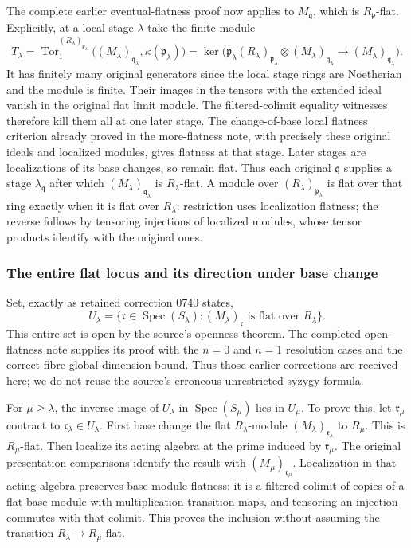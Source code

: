 The complete earlier eventual-flatness proof now applies to \(M_{\mathfrak q}\), which is \(R_{\mathfrak p}\)-flat. Explicitly, at a local stage \(\lambda\) take the finite module \[
 T_\lambda=\operatorname{Tor}^{(R_\lambda)_{\mathfrak p_\lambda}}_1
 \big((M_\lambda)_{\mathfrak q_\lambda},\kappa(\mathfrak p_\lambda)\big)
 =\ker\big(\mathfrak p_\lambda(R_\lambda)_{\mathfrak p_\lambda}
       \otimes (M_\lambda)_{\mathfrak q_\lambda}
       \longrightarrow(M_\lambda)_{\mathfrak q_\lambda}\big).
\] It has finitely many original generators since the local stage rings are Noetherian and the module is finite. Their images in the tensors with the extended ideal vanish in the original flat limit module. The filtered-colimit equality witnesses therefore kill them all at one later stage. The change-of-base local flatness criterion already proved in the more-flatness note, with precisely these original ideals and localized modules, gives flatness at that stage. Later stages are localizations of its base changes, so remain flat. Thus each original \(\mathfrak q\) supplies a stage \(\lambda_{\mathfrak q}\) after which \((M_\lambda)_{\mathfrak q_\lambda}\) is \(R_\lambda\)-flat. A module over \((R_\lambda)_{\mathfrak p_\lambda}\) is flat over that ring exactly when it is flat over \(R_\lambda\): restriction uses localization flatness; the reverse follows by tensoring injections of localized modules, whose tensor products identify with the original ones.

\subsubsection{The entire flat locus and its direction under base change}\label{the-entire-flat-locus-and-its-direction-under-base-change}

Set, exactly as retained correction 0740 states, \[
 U_\lambda=\{\mathfrak r\in\operatorname{Spec}(S_\lambda):
                    (M_\lambda)_{\mathfrak r}\text{ is flat over }R_\lambda\}.
\] This entire set is open by the source's openness theorem. The completed open-flatness note supplies its proof with the \(n=0\) and \(n=1\) resolution cases and the correct fibre global-dimension bound. Thus those earlier corrections are received here; we do not reuse the source's erroneous unrestricted syzygy formula.

For \(\mu\ge\lambda\), the inverse image of \(U_\lambda\) in \(\operatorname{Spec}(S_\mu)\) lies in \(U_\mu\). To prove this, let \(\mathfrak r_\mu\) contract to \(\mathfrak r_\lambda\in U_\lambda\). First base change the flat \(R_\lambda\)-module \((M_\lambda)_{\mathfrak r_\lambda}\) to \(R_\mu\). This is \(R_\mu\)-flat. Then localize its acting algebra at the prime induced by \(\mathfrak r_\mu\). The original presentation comparisons identify the result with \((M_\mu)_{\mathfrak r_\mu}\). Localization in that acting algebra preserves base-module flatness: it is a filtered colimit of copies of a flat base module with multiplication transition maps, and tensoring an injection commutes with that colimit. This proves the inclusion without assuming the transition \(R_\lambda\to R_\mu\) flat.

